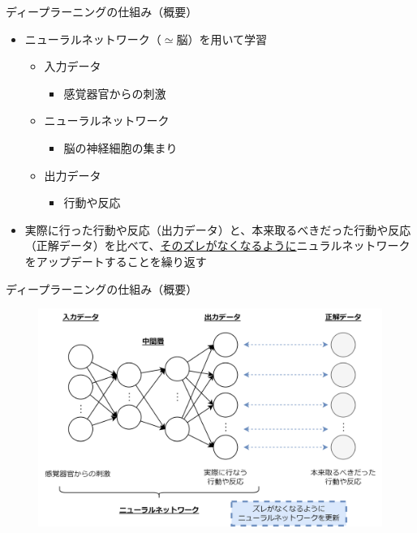 \documentclass[dvipdfmx,aspectratio=169]{beamer}
\begin{document}
	\begin{frame}{ディープラーニングの仕組み（概要）}
		\begin{itemize}
			\item \alert{ニューラルネットワーク}（$ \simeq $脳）を用いて学習
			\begin{itemize}
				\item \alert{入力データ}
				\begin{itemize}
					\item 感覚器官からの刺激
				\end{itemize}
				\item \alert{ニューラルネットワーク}
				\begin{itemize}
					\item 脳の神経細胞の集まり
				\end{itemize}
				\item \alert{出力データ}
				\begin{itemize}
					\item 行動や反応
				\end{itemize}
			\end{itemize}
			\item
				実際に行った行動や反応（\alert{出力データ}）と、本来取るべきだった行動や反応（\alert{正解データ}）を比べて、\underline{そのズレがなくなるように}ニュラルネットワークをアップデートすることを繰り返す
		\end{itemize}
	\end{frame}

	\begin{frame}{ディープラーニングの仕組み（概要）}
		\begin{figure}
			\centering
			\includegraphics[width=0.8\linewidth]{ディープラーニングの仕組み（概要）}
		\end{figure}
	\end{frame}
\end{document}

